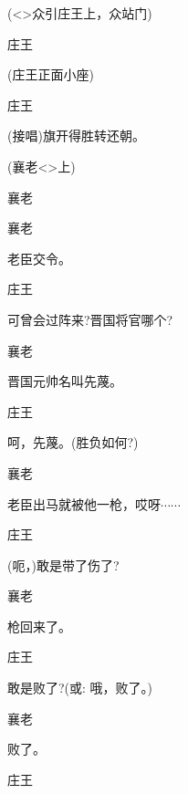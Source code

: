{\vspace{5pt}

(\textless{}\!\textgreater{}众引庄王上，众站门)

庄王


(庄王正面小座)

庄王\hspace{30pt}~

({\akai 接唱})旗开得胜转还朝。

(襄老\textless{}\!\textgreater{}上)

襄老


襄老\hspace{30pt}~

老臣交令。

庄王\hspace{30pt}~

可曾会过阵来?晋国将官哪个?

襄老\hspace{30pt}~

晋国元帅名叫先蔑。

庄王\hspace{30pt}~

呵，先蔑。(胜负如何?)

襄老\hspace{30pt}~

老臣出马就被他一枪，哎呀$\cdots{}\cdots{}$

庄王\hspace{30pt}~

(呃，)敢是带了伤了?

襄老\hspace{30pt}~

枪回来了。

庄王\hspace{30pt}~

敢是败了?({\akai 或}: 哦，败了。)

襄老\hspace{30pt}~

败了。

庄王\hspace{30pt}~

}
